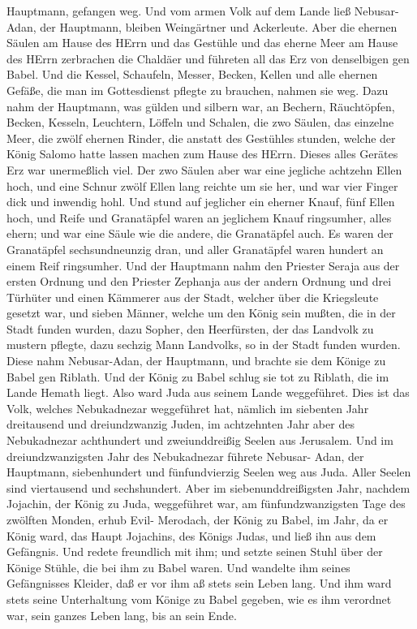 Hauptmann, gefangen weg.  Und vom armen Volk auf dem Lande
ließ Nebusar-Adan, der Hauptmann, bleiben Weingärtner und Ackerleute.
 Aber die ehernen Säulen am Hause des HErrn und das
Gestühle und das eherne Meer am Hause des HErrn zerbrachen die Chaldäer
und führeten all das Erz von denselbigen gen Babel.  Und
die Kessel, Schaufeln, Messer, Becken, Kellen und alle ehernen Gefäße,
die man im Gottesdienst pflegte zu brauchen, nahmen sie weg.
 Dazu nahm der Hauptmann, was gülden und silbern war, an
Bechern, Räuchtöpfen, Becken, Kesseln, Leuchtern, Löffeln und Schalen,
 die zwo Säulen, das einzelne Meer, die zwölf ehernen
Rinder, die anstatt des Gestühles stunden, welche der König Salomo hatte
lassen machen zum Hause des HErrn. Dieses alles Gerätes Erz war
unermeßlich viel.  Der zwo Säulen aber war eine jegliche
achtzehn Ellen hoch, und eine Schnur zwölf Ellen lang reichte um sie
her, und war vier Finger dick und inwendig hohl.  Und stund
auf jeglicher ein eherner Knauf, fünf Ellen hoch, und Reife und
Granatäpfel waren an jeglichem Knauf ringsumher, alles ehern; und war
eine Säule wie die andere, die Granatäpfel auch.  Es waren
der Granatäpfel sechsundneunzig dran, und aller Granatäpfel waren
hundert an einem Reif ringsumher.  Und der Hauptmann nahm
den Priester Seraja aus der ersten Ordnung und den Priester Zephanja aus
der andern Ordnung und drei Türhüter  und einen Kämmerer
aus der Stadt, welcher über die Kriegsleute gesetzt war, und sieben
Männer, welche um den König sein mußten, die in der Stadt funden wurden,
dazu Sopher, den Heerfürsten, der das Landvolk zu mustern pflegte, dazu
sechzig Mann Landvolks, so in der Stadt funden wurden. 
Diese nahm Nebusar-Adan, der Hauptmann, und brachte sie dem Könige zu
Babel gen Riblath.  Und der König zu Babel schlug sie tot
zu Riblath, die im Lande Hemath liegt. Also ward Juda aus seinem Lande
weggeführet.  Dies ist das Volk, welches Nebukadnezar
weggeführet hat, nämlich im siebenten Jahr dreitausend und
dreiundzwanzig Juden,  im achtzehnten Jahr aber des
Nebukadnezar achthundert und zweiunddreißig Seelen aus Jerusalem.
 Und im dreiundzwanzigsten Jahr des Nebukadnezar führete
Nebusar- Adan, der Hauptmann, siebenhundert und fünfundvierzig Seelen
weg aus Juda. Aller Seelen sind viertausend und sechshundert.
 Aber im siebenunddreißigsten Jahr, nachdem Jojachin, der
König zu Juda, weggeführet war, am fünfundzwanzigsten Tage des zwölften
Monden, erhub Evil- Merodach, der König zu Babel, im Jahr, da er König
ward, das Haupt Jojachins, des Königs Judas, und ließ ihn aus dem
Gefängnis.  Und redete freundlich mit ihm; und setzte
seinen Stuhl über der Könige Stühle, die bei ihm zu Babel waren.
 Und wandelte ihm seines Gefängnisses Kleider, daß er vor
ihm aß stets sein Leben lang.  Und ihm ward stets seine
Unterhaltung vom Könige zu Babel gegeben, wie es ihm verordnet war, sein
ganzes Leben lang, bis an sein Ende.
